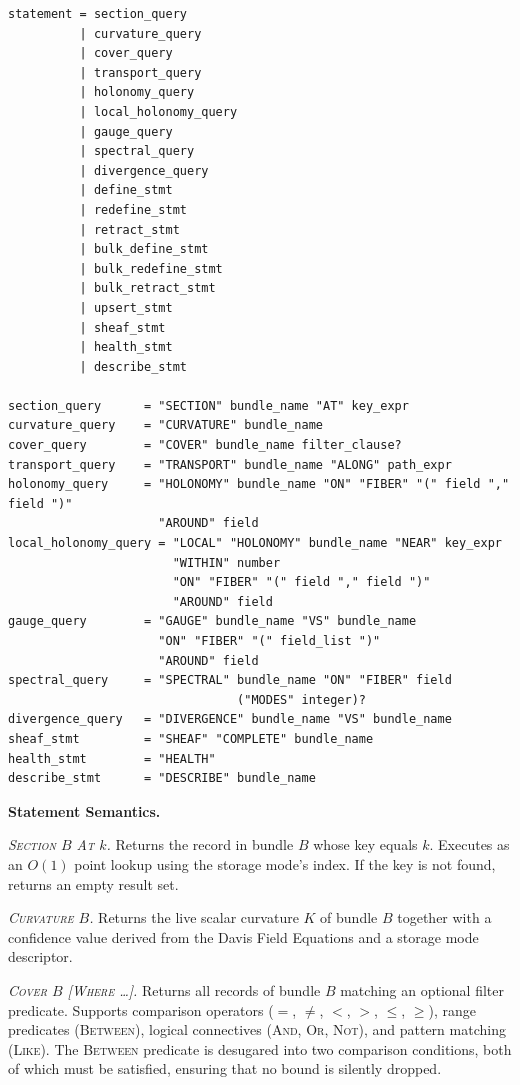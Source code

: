 \documentclass[11pt,letterpaper]{article}
\begin{document}
\begin{lstlisting}
statement = section_query
          | curvature_query
          | cover_query
          | transport_query
          | holonomy_query
          | local_holonomy_query
          | gauge_query
          | spectral_query
          | divergence_query
          | define_stmt
          | redefine_stmt
          | retract_stmt
          | bulk_define_stmt
          | bulk_redefine_stmt
          | bulk_retract_stmt
          | upsert_stmt
          | sheaf_stmt
          | health_stmt
          | describe_stmt

section_query      = "SECTION" bundle_name "AT" key_expr
curvature_query    = "CURVATURE" bundle_name
cover_query        = "COVER" bundle_name filter_clause?
transport_query    = "TRANSPORT" bundle_name "ALONG" path_expr
holonomy_query     = "HOLONOMY" bundle_name "ON" "FIBER" "(" field "," field ")"
                     "AROUND" field
local_holonomy_query = "LOCAL" "HOLONOMY" bundle_name "NEAR" key_expr
                       "WITHIN" number
                       "ON" "FIBER" "(" field "," field ")"
                       "AROUND" field
gauge_query        = "GAUGE" bundle_name "VS" bundle_name
                     "ON" "FIBER" "(" field_list ")"
                     "AROUND" field
spectral_query     = "SPECTRAL" bundle_name "ON" "FIBER" field
                                ("MODES" integer)?
divergence_query   = "DIVERGENCE" bundle_name "VS" bundle_name
sheaf_stmt         = "SHEAF" "COMPLETE" bundle_name
health_stmt        = "HEALTH"
describe_stmt      = "DESCRIBE" bundle_name
\end{lstlisting}

\textbf{Statement Semantics.}

\textit{\textsc{Section} $B$ \textsc{At} $k$.} Returns the record in bundle $B$ whose key equals $k$. Executes as an $O(1)$ point lookup using the storage mode's index. If the key is not found, returns an empty result set.

\textit{\textsc{Curvature} $B$.} Returns the live scalar curvature $K$ of bundle $B$ together with a confidence value derived from the Davis Field Equations and a storage mode descriptor.

\textit{\textsc{Cover} $B$ [\textsc{Where} \ldots].} Returns all records of bundle $B$ matching an optional filter predicate. Supports comparison operators ($=$, $\neq$, $<$, $>$, $\leq$, $\geq$), range predicates (\textsc{Between}), logical connectives (\textsc{And}, \textsc{Or}, \textsc{Not}), and pattern matching (\textsc{Like}). The \textsc{Between} predicate is desugared into two comparison conditions, both of which must be satisfied, ensuring that no bound is silently dropped.
\end{document}
